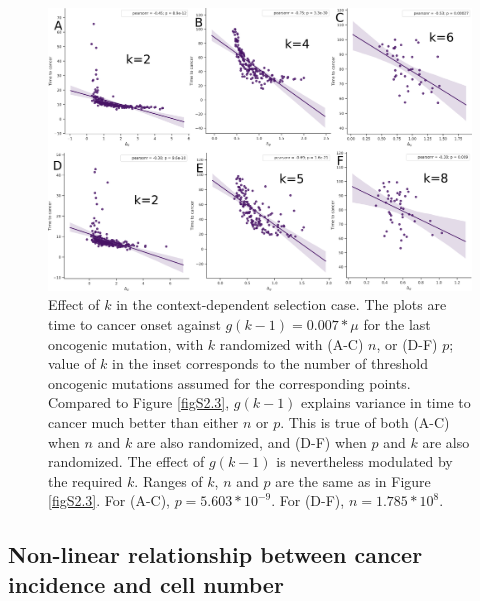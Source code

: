 \documentclass[9pt,onecolumn,twoside]{pnas-new}
\begin{document}
		\begin{figure}[tbhp]
			\centering
			\includegraphics[width=.8\linewidth]{figS2-4.png}
			\caption{Effect of $k$ in the context-dependent selection case. The plots are time to cancer onset against $g(k-1)=0.007*\mu$ for the last oncogenic mutation, with $k$ randomized with (A-C) $n$, or (D-F) $p$; value of $k$ in the inset corresponds to the number of threshold oncogenic mutations assumed for the corresponding points. Compared to Figure \ref{figS2.3}, $g(k-1)$ explains variance in time to cancer much better than either $n$ or $p$. This is true of both (A-C) when $n$ and $k$ are also randomized, and (D-F) when $p$ and $k$ are also randomized. The effect of $g(k-1)$ is nevertheless modulated by the required $k$. Ranges of $k$, $n$ and $p$ are the same as in Figure \ref{figS2.3}. For (A-C), $p=5.603*10^{-9}$. For (D-F), $n=1.785*10^{8}$.}
			\label{figS2.4}
		\end{figure}

	\subsection{Non-linear relationship between cancer incidence and cell number}\label{S3 Text}
		\renewcommand{\thefigure}{S3.\arabic{figure}}
		\setcounter{figure}{0}

		\renewcommand{\thetable}{S3.\arabic{table}}
		\setcounter{table}{0}
\end{document}
